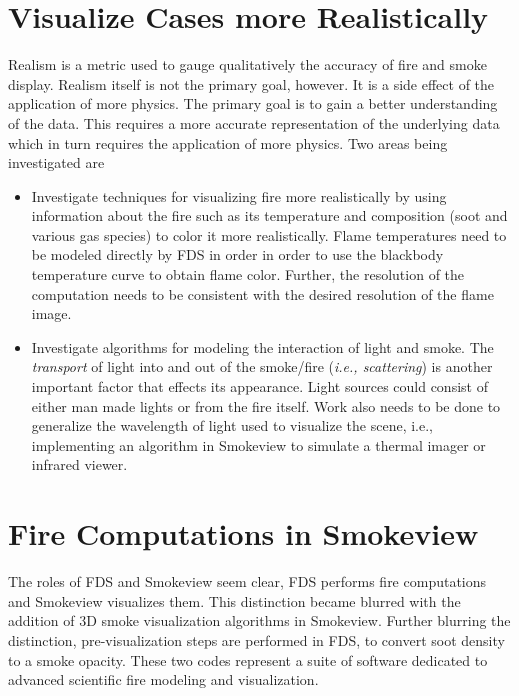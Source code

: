 \documentclass[11pt,twoside]{book}
\begin{document}
%
%

\section{Visualize Cases more Realistically}
Realism is a metric used to gauge qualitatively the accuracy of
fire and smoke display. Realism itself is not the primary goal,
however.  It is a side effect of the application of more physics.
The primary goal is to gain a better understanding of the data.
This requires a more accurate representation of the underlying
data which in turn requires the application of more physics.  Two
areas being investigated are
\begin{itemize}
\item Investigate techniques for visualizing fire more
realistically by using information about the fire such as its
temperature and composition (soot and various gas species) to
color it more realistically.  Flame temperatures need to be
modeled directly by FDS in order in order to use the blackbody
temperature curve to obtain flame color.  Further, the resolution
of the computation needs to be consistent with the desired
resolution of the flame image.

\item Investigate algorithms for modeling the interaction of light
and smoke. The {\em transport} of light into and out of the
smoke/fire ({\em i.e., scattering}) is another important factor
that effects its appearance.  Light sources could consist of
either man made lights or from the fire itself.  Work also needs
to be done to generalize the wavelength of light used to visualize
the scene, i.e., implementing an algorithm in Smokeview to
simulate a thermal imager or infrared viewer.
\end{itemize}

%
%

\section{Fire Computations in Smokeview}
The roles of FDS and Smokeview seem clear, FDS performs fire
computations and Smokeview visualizes them. This distinction
became blurred with the addition of 3D smoke visualization
algorithms in Smokeview. Further blurring the distinction,
pre-visualization steps are performed in FDS, to convert soot
density to a smoke opacity. These two codes represent a suite of
software dedicated to advanced scientific fire modeling and
visualization.
\end{document}
